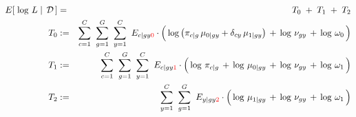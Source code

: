 \begin{eqnarray*}
E\!\left[\,\left.\log\,L\;\right\vert\;\mathcal{D}\,\right]
&=& T_{0} \;+\; T_{1} \;+\; T_{2}
\\
T_{0}
&:=&
	\overset{C}{\underset{c=1}{\sum}}\;\;
	\overset{G}{\underset{g=1}{\sum}}\;\;
	\overset{C}{\underset{y=1}{\sum}}\;\;
	E_{c \vert gy{\color{red}0}}
	\cdot
	\left(\,
		\log\left(\pi_{c \vert g}\,\mu_{0 \vert gy} + \delta_{cy}\,\mu_{1\vert gy}\right)
		\,\overset{{\color{white}.}}{+}\,
		\log\,\nu_{gy}
		\,\overset{{\color{white}.}}{+}\,
		\log\,\omega_{0}
	\,\right)
\\
T_{1}
&:=&
	\overset{C}{\underset{c=1}{\sum}}\;\;
	\overset{G}{\underset{g=1}{\sum}}\;\;
	\overset{C}{\underset{y=1}{\sum}}\;\;
	E_{c \vert gy{\color{red}1}}
	\cdot
	\left(\,
		\log\,\pi_{c \vert g}
		\,\overset{{\color{white}.}}{+}\,
		\log\,\mu_{0\vert gy}
		\,\overset{{\color{white}.}}{+}\,
		\log\,\nu_{gy}
		\,\overset{{\color{white}.}}{+}\,
		\log\,\omega_{1}
	\,\right)
\\
T_{2}
&:=&
	\overset{C}{\underset{y=1}{\sum}}\;\;
	\overset{G}{\underset{g=1}{\sum}}\;\;
	E_{y \vert gy{\color{red}2}}
	\cdot
	\left(\,
		\log\,\mu_{1 \vert gy}
		\,\overset{{\color{white}.}}{+}\,
		\log\,\nu_{gy}
		\,\overset{{\color{white}.}}{+}\,
		\log\,\omega_{1}
	\,\right)
\end{eqnarray*}

